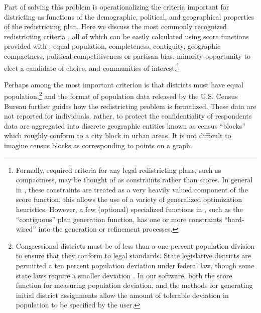 \documentclass[article]{JSSstyle/jss}
\begin{document}
Part of solving this problem is operationalizing the criteria important 
for districting as functions of the demographic, political, and geographical 
properties of the redistricting plan. Here we discuss the most commonly recognized redistricting criteria \citep[see][]{McDonald04}, 
all of which can be easily calculated using score functions provided with : equal population, 
completeness, contiguity, geographic compactness, political competitiveness or partisan bias, 
minority-opportunity to elect a candidate of choice, and 
communities of interest.\footnote{Formally, required criteria for any legal redistricting plans, 
such as compactness, may be thought of as constraints rather than scores. 
In general in , these constraints are treated as 
a very heavily valued component of the score function, this allows the use of a variety of generalized optimization heuristics. However,  a few (optional) specialized functions in , such as the ``contiguous'' plan generation function, has one or more constraints ``hard-wired'' into the generation or refinement processes. } 

Perhaps among the most important criterion is that districts 
must have equal population,\footnote{Congressional districts must be 
of less than a one percent population division to ensure that they 
conform to legal standards.  State legislative districts are 
permitted a ten percent population deviation under federal law, 
though some state laws require a smaller deviation \citep[][]{CainMacMc05}
. In our software, both the score function for measuring population deviation, and the methods for generating initial district assignments allow the amount of tolerable deviation in population to be specified by the user. } and the format of population data released by the U.S. Census 
Bureau further guides how the redistricting problem is formalized.  
These data are not reported for individuals, rather, to protect the 
confidentiality of respondents data are aggregated into discrete 
geographic entities known as census ``blocks'' which roughly conform 
to a city block in urban areas.  It is not difficult to imagine census blocks as corresponding to 
points on a graph.  
\end{document}
